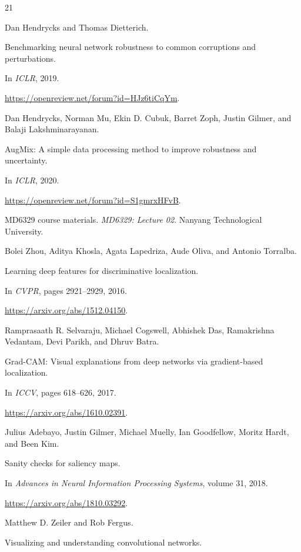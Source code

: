 \begin{thebibliography}{21}

Dan Hendrycks and Thomas Dietterich.

Benchmarking neural network robustness to common corruptions and perturbations.

In \emph{ICLR}, 2019.

\url{https://openreview.net/forum?id=HJz6tiCqYm}.


Dan Hendrycks, Norman Mu, Ekin D. Cubuk, Barret Zoph, Justin Gilmer, and Balaji Lakshminarayanan.

AugMix: A simple data processing method to improve robustness and uncertainty.

In \emph{ICLR}, 2020.

\url{https://openreview.net/forum?id=S1gmrxHFvB}.

MD6329 course materials.
\emph{MD6329: Lecture 02}. Nanyang Technological University.


Bolei Zhou, Aditya Khosla, Agata Lapedriza, Aude Oliva, and Antonio Torralba.

Learning deep features for discriminative localization.

In \emph{CVPR}, pages 2921--2929, 2016.

\url{https://arxiv.org/abs/1512.04150}.


Ramprasaath R. Selvaraju, Michael Cogswell, Abhishek Das, Ramakrishna Vedantam, Devi Parikh, and Dhruv Batra.

Grad-CAM: Visual explanations from deep networks via gradient-based localization.

In \emph{ICCV}, pages 618--626, 2017.

\url{https://arxiv.org/abs/1610.02391}.


Julius Adebayo, Justin Gilmer, Michael Muelly, Ian Goodfellow, Moritz Hardt, and Been Kim.

Sanity checks for saliency maps.

In \emph{Advances in Neural Information Processing Systems}, volume 31, 2018.

\url{https://arxiv.org/abs/1810.03292}.


Matthew D. Zeiler and Rob Fergus.

Visualizing and understanding convolutional networks.


\end{thebibliography}
